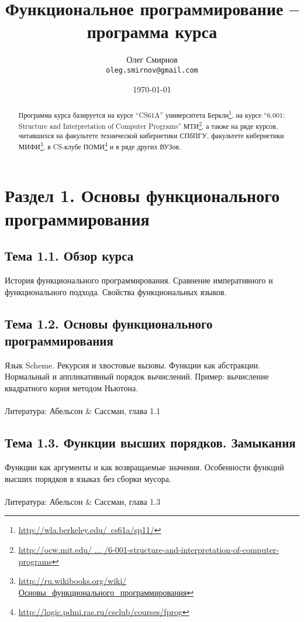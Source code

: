\documentclass[a4paper,11pt]{article}
\author{Олег Смирнов \\
\texttt{oleg.smirnov@gmail.com}}
\date{\today}
\title{Функциональное программирование -- программа курса}
\begin{document}
\maketitle

\begin{abstract}
Программа курса базируется на курсе ``CS61A'' университета
Беркли\footnote{\href{http://goo.gl/kl7tc}
{http://wla.berkeley.edu/~cs61a/sp11/}}, на курсе ``6.001: Structure and
Interpretation of Computer Programs'' МТИ\footnote{\href{http://goo.gl/MW2ME}
{http://ocw.mit.edu/ ... /6-001-structure-and-interpretation-of-computer-programs}},
а также на ряде курсов, читавшихся на факультете технической кибернетики СПбПГУ,
факультете кибернетики МИФИ\footnote{\href{http://goo.gl/pbV08}
{http://ru.wikibooks.org/wiki/Основы\_функционального\_программирования}},
в CS-клубе ПОМИ\footnote{\href{http://goo.gl/N0la1}
{http://logic.pdmi.ras.ru/csclub/courses/fprog}} и в ряде других ВУЗов.
\end{abstract}

\section*{Раздел 1. Основы функционального программирования}

\subsection*{Тема 1.1. Обзор курса}
История функционального программирования. Сравнение императивного и
функционального подхода. Свойства функциональных языков.

\subsection*{Тема 1.2. Основы функционального программирования}
Язык Scheme. Рекурсия и хвостовые вызовы. Функции как абстракции. 
Нормальный и аппликативный порядок вычислений. Пример: вычисление 
квадратного корня методом Ньютона. 
\\\\
Литература: Абельсон \& Сассман, глава 1.1

\subsection*{Тема 1.3. Функции высших порядков. Замыкания}
Функции как аргументы и как возвращаемые значения. Особенности функций
высших порядков в языках без сборки мусора.
\\\\
Литература: Абельсон \& Сассман, глава 1.3
\end{document}
